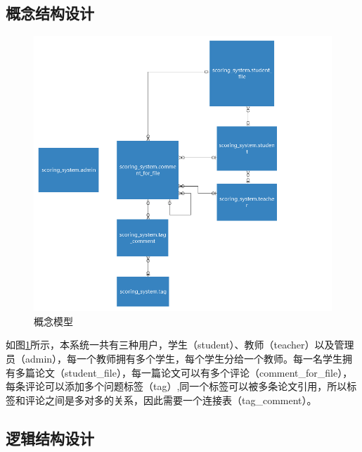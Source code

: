 \subsection{概念结构设计}

\begin{figure}[H]
    \centering
    \includegraphics[scale = 0.5]{out/uml/数据库/conceptual-model.png}
    \caption{\song\wuhao 概念模型}
    \label{conceptual-model}
\end{figure}

如图\ref{conceptual-model}所示，本系统一共有三种用户，学生（student）、教师（teacher）以及管理员（admin），每一个教师拥有多个学生，每个学生分给一个教师。每一名学生拥有多篇论文（student\_file），每一篇论文可以有多个评论（comment\_for\_file），每条评论可以添加多个问题标签（tag）,同一个标签可以被多条论文引用，所以标签和评论之间是多对多的关系，因此需要一个连接表（tag\_comment）。

\subsection{逻辑结构设计}

